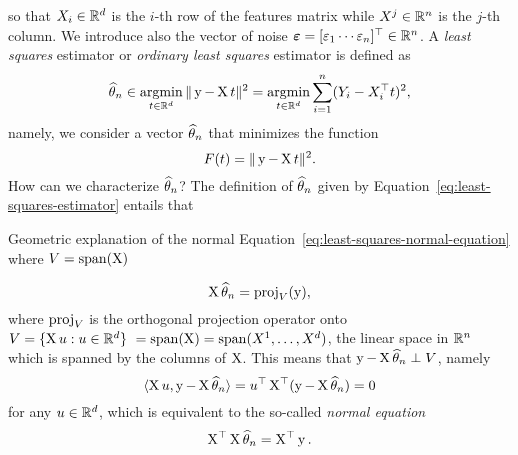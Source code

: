 so that $X_i \in \mathbb R^d$ is the $i$-th row of the features matrix while $X^j \in \mathbb R^n$ is the $j$-th column.
We introduce also the vector of noise $\operatorname{\boldsymbol \varepsilon} = [\varepsilon_1 \cdots \varepsilon_n]^\top \in \mathbb R^n$.
A \emph{least squares} estimator or \emph{ordinary least squares} estimator is defined as
\begin{equation}
	\label{eq:least-squares-estimator}
	\widehat \theta_n \in \operatorname*{argmin}_{t \in \mathbb R^d} \| \operatorname{{\boldsymbol y}} - \operatorname{{\boldsymbol X}} t \|^2 = \operatorname*{argmin}_{t \in \mathbb R^d} \sum_{i=1}^n (Y_i - X_i^\top t)^2,
\end{equation}
namely, we consider a vector $\widehat \theta_n$ that minimizes%
 the function
\begin{equation}
	\label{eq:least-squares-objective}
	F(t) = \| \operatorname{{\boldsymbol y}} - \operatorname{{\boldsymbol X}} t \|^2.
\end{equation}
How can we characterize $\widehat \theta_n$?
The definition of $\widehat \theta_n$ given by Equation~\eqref{eq:least-squares-estimator} entails that%
\begin{marginfigure}%
%
\caption{Geometric explanation of the normal Equation~\eqref{eq:least-squares-normal-equation} where $V = \operatorname*{span}(\operatorname{{\boldsymbol X}})$}
\end{marginfigure}%
\begin{equation*}%
	\bX \wh \theta_n = \proj_V (\by),
\end{equation*}
where $\operatorname{proj}_V$ is the orthogonal projection operator onto $V = \{ \bX u : u \in \R^d \} = \spa(\bX) = \spa(X^1, \ldots, X^d)$, the linear space in $\mathbb R^n$ which is spanned by the columns of $\operatorname{{\boldsymbol X}}$.
This means that $\operatorname{{\boldsymbol y}} - \operatorname{{\boldsymbol X}} \widehat \theta_n \perp V$, namely 
\begin{equation*}
	\langle \operatorname{{\boldsymbol X}} u, \operatorname{{\boldsymbol y}} - \operatorname{{\boldsymbol X}} \widehat \theta_n \rangle = u^\top \operatorname{{\boldsymbol X}}^\top (\operatorname{{\boldsymbol y}} - \operatorname{{\boldsymbol X}} \widehat \theta_n) = 0
\end{equation*}
for any $u \in \mathbb R^d$, which is equivalent to the so-called \emph{normal equation}
\begin{equation}
	\label{eq:least-squares-normal-equation}
	\operatorname{{\boldsymbol X}}^\top \operatorname{{\boldsymbol X}} \widehat \theta_n = \operatorname{{\boldsymbol X}}^\top \operatorname{{\boldsymbol y}}.
\end{equation}
